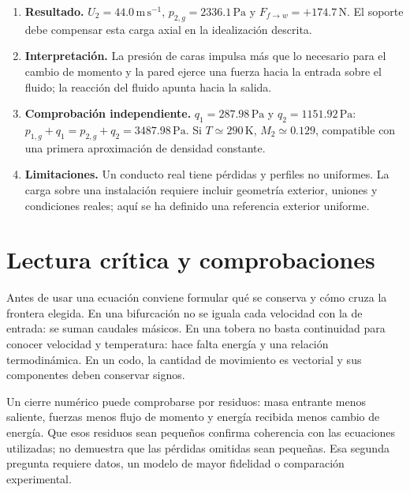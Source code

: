 \begin{enumerate}
\item \textbf{Resultado.} $U_2=44.0\,\mathrm{m\,s^{-1}}$, $p_{2,g}=2336.1\,\mathrm{Pa}$ y $F_{f\to w}=+174.7\,\mathrm{N}$. El soporte debe compensar esta carga axial en la idealización descrita.
\item \textbf{Interpretación.} La presión de caras impulsa más que lo necesario para el cambio de momento y la pared ejerce una fuerza hacia la entrada sobre el fluido; la reacción del fluido apunta hacia la salida.
\item \textbf{Comprobación independiente.} $q_1=287.98\,\mathrm{Pa}$ y $q_2=1151.92\,\mathrm{Pa}$: $p_{1,g}+q_1=p_{2,g}+q_2=3487.98\,\mathrm{Pa}$. Si $T\simeq290\,\mathrm{K}$, $M_2\simeq0.129$, compatible con una primera aproximación de densidad constante.
\item \textbf{Limitaciones.} Un conducto real tiene pérdidas y perfiles no uniformes. La carga sobre una instalación requiere incluir geometría exterior, uniones y condiciones reales; aquí se ha definido una referencia exterior uniforme.
\end{enumerate}

\section{Lectura crítica y comprobaciones}
Antes de usar una ecuación conviene formular qué se conserva y cómo cruza la frontera elegida. En una bifurcación no se iguala cada velocidad con la de entrada: se suman caudales másicos. En una tobera no basta continuidad para conocer velocidad y temperatura: hace falta energía y una relación termodinámica. En un codo, la cantidad de movimiento es vectorial y sus componentes deben conservar signos.

Un cierre numérico puede comprobarse por residuos: masa entrante menos saliente, fuerzas menos flujo de momento y energía recibida menos cambio de energía. Que esos residuos sean pequeños confirma coherencia con las ecuaciones utilizadas; no demuestra que las pérdidas omitidas sean pequeñas. Esa segunda pregunta requiere datos, un modelo de mayor fidelidad o comparación experimental.

